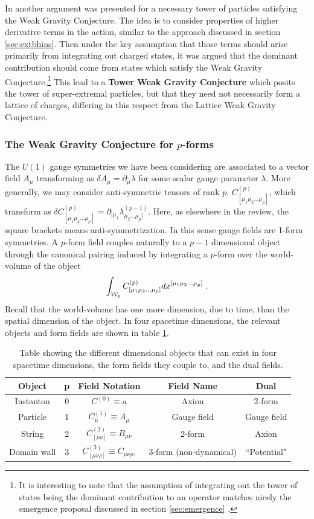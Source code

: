 \documentclass[11pt,a4paper]{article}
\numberwithin{equation}{section}
\numberwithin{table}{section}\setlength{\multlinegap}{25pt}
\newcommand{\be}{\begin{equation}}
\newcommand{\ee}{\end{equation}}
\begin{document}
In \cite{Andriolo:2018lvp} another argument was presented for a necessary tower of particles satisfying the Weak Gravity Conjecture. The idea is to consider properties of higher derivative terms in the action, similar to the approach discussed in section \ref{sec:extbhins}. Then under the key assumption that those terms should arise primarily from integrating out charged states, it was argued that the dominant contribution should come from states which satisfy the Weak Gravity Conjecture.\footnote{It is interesting to note that the assumption of integrating out the tower of states being the dominant contribution to an operator matches nicely the emergence proposal discussed in section \ref{sec:emergence} \cite{danielcomment}.} This lead to a {\bf Tower Weak Gravity Conjecture} which posits the tower of super-extremal particles, but that they need not necessarily form a lattice of charges, differing in this respect from the Lattice Weak Gravity Conjecture. 

\subsubsection{The Weak Gravity Conjecture for $p$-forms}

The $U(1)$ gauge symmetries we have been considering are associated to a vector field $A_{\mu}$ transforming as $\delta A_{\mu} = \partial_{\mu} \lambda$ for some scalar gauge parameter $\lambda$. More generally, we may consider anti-symmetric tensors of rank $p$, $C^{(p)}_{[\mu_1\mu_2...\mu_p]}$, which transform as $\delta C^{(p)}_{[\mu_1\mu_2...\mu_p]} = \partial_{[\mu_1}\lambda^{(p-1)}_{\mu_2...\mu_p]}$. Here, as elsewhere in the review, the square brackets means anti-symmetrization. In this sense gauge fields are 1-form symmetries. A $p$-form field couples naturally to a $p-1$ dimensional object through the canonical pairing induced by integrating a $p$-form over the world-volume of the object
\be
\int_{{\cal W}_p} C^{(p)}_{[\mu_1\mu_2...\mu_p]} dx^{[\mu_1\mu_2...\mu_p]}  \;.
\ee 
Recall that the world-volume has one more dimension, due to time, than the spatial dimension of the object. In four spacetime dimensions, the relevant objects and form fields are shown in table \ref{tab:pforms}. 
\begin{table}[h]
\center
\begin{tabular}{|c|c|c|c|c|}
\hline
{\bf Object} &{\bf  p }&{\bf  Field Notation }& {\bf Field Name }& {\bf Dual}\\
\hline
Instanton & 0 &$C^{(0)} \equiv a$ & Axion & 2-form \\
\hline
Particle & 1 &$C^{(1)}_{\mu} \equiv A_{\mu}$ & Gauge field & Gauge field \\
\hline
String & 2 &$C^{(2)}_{[\mu\nu]} \equiv B_{\mu\nu}$ & 2-form & Axion\\
\hline
Domain wall & 3 &$C^{(3)}_{[\mu\nu\rho]} \equiv C_{\mu\nu\rho}$, & 3-form (non-dynamical) & ``Potential" \\
\hline
\end{tabular}
\caption{Table showing the different dimensional objects that can exist in four spacetime dimensions, the form fields they couple to, and the dual fields.}
\label{tab:pforms}
\end{table}
\end{document}
